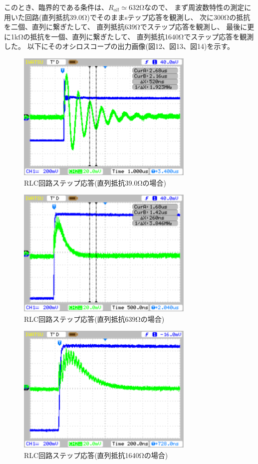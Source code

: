 \documentclass[10pt,a4j,dvipdfmx]{jsarticle}
\begin{document}
このとき、臨界的である条件は、$R_{all} \simeq 632\si{\ohm}$なので、
まず周波数特性の測定に用いた回路(直列抵抗39.0\si{\ohm})でそのままsテップ応答を観測し、
次に300\si{\ohm}の抵抗を二個、直列に繋ぎたして、
直列抵抗639\si{\ohm}でステップ応答を観測し、
最後に更に1\si{\kilo\ohm}の抵抗を一個、直列に繋ぎたして、
直列抵抗1640\si{\ohm}でステップ応答を観測した。
以下にそのオシロスコープの出力画像(図12、図13、図14)を示す。
\begin{figure}[H]
  \centering
  \includegraphics[width=8.5cm]{sindougensui.pdf}
  \caption{RLC回路ステップ応答(直列抵抗39.0\si{\ohm}の場合)}
\end{figure}
\begin{figure}[H]
  \centering
  \includegraphics[width=8.5cm]{rinkaigensui.pdf}
  \caption{RLC回路ステップ応答(直列抵抗639\si{\ohm}の場合)}
\end{figure}
\begin{figure}[H]
  \centering
  \includegraphics[width=8.5cm]{kagensui.pdf}
  \caption{RLC回路ステップ応答(直列抵抗1640\si{\ohm}の場合)}
\end{figure}
\end{document}
